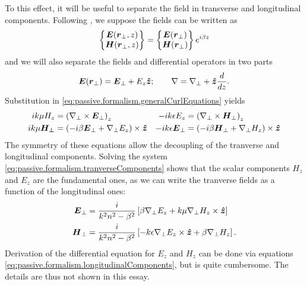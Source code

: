 To this effect, it will be useful to separate the field 
in transverse and longitudinal components. Following \cite{JAC1962,SCH2004b}, 
we suppose the fields can be written as 
  \begin{equation}
    \begin{Bmatrix}\boldsymbol{E}(\boldsymbol{r}_\perp,z)\\\boldsymbol{H}(\boldsymbol{r}_\perp,z)\end{Bmatrix} = \begin{Bmatrix}\boldsymbol{E}(\boldsymbol{r}_\perp)\\\boldsymbol{H}(\boldsymbol{r}_\perp)\end{Bmatrix}e^{i\beta z}
  \end{equation}
and we will also separate the fields and differential operators in two parts
  \begin{equation}
   \boldsymbol{E}(\boldsymbol{r}_\perp)= \boldsymbol{E}_\perp+E_z\boldsymbol{\hat{z}}; \qquad \nabla=\nabla_\perp + \boldsymbol{\hat{z}}\frac{d}{dz}.
  \end{equation}
Substitution in \eqref{eq:passive.formalism.generalCurlEquations} yields
  \begin{align}
    ik\mu H_z 		&= \left(\nabla_\perp\times\boldsymbol{E}_\perp\right)_z			& -ik\epsilon E_z 		&= \left(\nabla_\perp\times \boldsymbol{H}_\perp\right)_z	\label{eq:passive.formalism.longitudinalComponents}\\
    ik\mu\boldsymbol{H_\perp}	&= \left(-i\beta\boldsymbol{E}_\perp+\nabla_\perp E_z\right)\times\boldsymbol{\hat{z}}	& -ik\epsilon\boldsymbol{E}_\perp 	&= \left(-i\beta\boldsymbol{H}_\perp+\nabla_\perp H_z\right)\times\boldsymbol{\hat{z}} \label{eq:passive.formalism.tranverseComponents}
  \end{align}
The symmetry of these equations allow the decoupling of the tranverse and longitudinal components. 
Solving the system \eqref{eq:passive.formalism.tranverseComponents} 
shows that the scalar components $H_z$ and $E_z$ are the fundamental ones, 
as we can write the tranverse fields as a function of the longitudinal
ones:
  \begin{subequations}
  \begin{align}
    \boldsymbol{E}_\perp	&= \frac{i}{k^2n^2-\beta^2}\left[\beta\nabla_\perp E_z+k\mu\nabla_\perp H_z\times\boldsymbol{\hat{z}}\right]	\\
    \boldsymbol{H}_\perp	&= \frac{i}{k^2n^2-\beta^2}\left[-k\epsilon\nabla_\perp E_z\times\boldsymbol{\hat{z}}+\beta\nabla_\perp H_z\right].
  \end{align}
  \end{subequations}
Derivation of the differential equation for $E_z$ and $H_z$ can be
done via equations \eqref{eq:passive.formalism.longitudinalComponents}, but
is quite cumbersome. The details are thus not shown in this essay.

